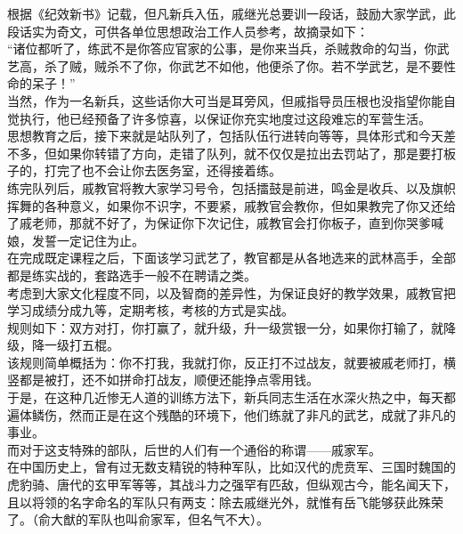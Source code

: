 \begin{multicols}{\theparacolNo}
根据《纪效新书》记载，但凡新兵入伍，戚继光总要训一段话，鼓励大家学武，此段话实为奇文，可供各单位思想政治工作人员参考，故摘录如下：\\

“诸位都听了，练武不是你答应官家的公事，是你来当兵，杀贼救命的勾当，你武艺高，杀了贼，贼杀不了你，你武艺不如他，他便杀了你。若不学武艺，是不要性命的呆子！”\\

当然，作为一名新兵，这些话你大可当是耳旁风，但戚指导员压根也没指望你能自觉执行，他已经预备了许多惊喜，以保证你充实地度过这段难忘的军营生活。\\

思想教育之后，接下来就是站队列了，包括队伍行进转向等等，具体形式和今天差不多，但如果你转错了方向，走错了队列，就不仅仅是拉出去罚站了，那是要打板子的，打完了也不会让你去医务室，还得接着练。\\

练完队列后，戚教官将教大家学习号令，包括擂鼓是前进，鸣金是收兵、以及旗帜挥舞的各种意义，如果你不识字，不要紧，戚教官会教你，但如果教完了你又还给了戚老师，那就不好了，为保证你下次记住，戚教官会打你板子，直到你哭爹喊娘，发誓一定记住为止。\\

在完成既定课程之后，下面该学习武艺了，教官都是从各地选来的武林高手，全部都是练实战的，套路选手一般不在聘请之类。\\

考虑到大家文化程度不同，以及智商的差异性，为保证良好的教学效果，戚教官把学习成绩分成九等，定期考核，考核的方式是实战。\\

规则如下：双方对打，你打赢了，就升级，升一级赏银一分，如果你打输了，就降级，降一级打五棍。\\

该规则简单概括为：你不打我，我就打你，反正打不过战友，就要被戚老师打，横竖都是被打，还不如拼命打战友，顺便还能挣点零用钱。\\

于是，在这种几近惨无人道的训练方法下，新兵同志生活在水深火热之中，每天都遍体鳞伤，然而正是在这个残酷的环境下，他们练就了非凡的武艺，成就了非凡的事业。\\

而对于这支特殊的部队，后世的人们有一个通俗的称谓——戚家军。\\

在中国历史上，曾有过无数支精锐的特种军队，比如汉代的虎贲军、三国时魏国的虎豹骑、唐代的玄甲军等等，其战斗力之强罕有匹敌，但纵观古今，能名闻天下，且以将领的名字命名的军队只有两支：除去戚继光外，就惟有岳飞能够获此殊荣了。（俞大猷的军队也叫俞家军，但名气不大）。\\


\end{multicols}
